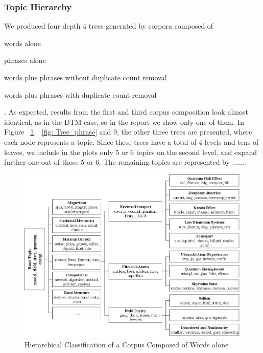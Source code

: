 \documentclass[DIV=calc, paper=letter, fontsize=10pt, twocolumn]{scrartcl}	 %
\begin{document}
\subsubsection*{Topic Hierarchy}
 We produced four depth 4 trees generated by corpora composed of
 \begin{inparaenum}
 \item  words alone
 \item phrases alone
 \item words plus phrases without duplicate count removal
 \item words plus phrases with duplicate count removal
 \end{inparaenum}
. As expected, results from the first and third corpus composition look almost identical, as in the DTM case, so in the report we show only one of them. In Figure ~\ref{fig: Tree_words}, ~\ref{fig: Tree_phrase} and 9, the other three trees are presented, where each node represents a topic. Since these trees have a total of 4 levels and tens of leaves, we include in the plots only 5 or 6 topics on the second level, and expand further one out of those 5 or 6. The remaining topics are represented by $\ldots \ldots$. 
\begin{figure}[!ht]
	\centerline{\includegraphics[scale = 1]{tree_words.eps}}
	\caption{Hierarchical Classification of a Corpus Composed of Words alone}
	 \label{fig: Tree_words}
\end{figure}
\end{document}
